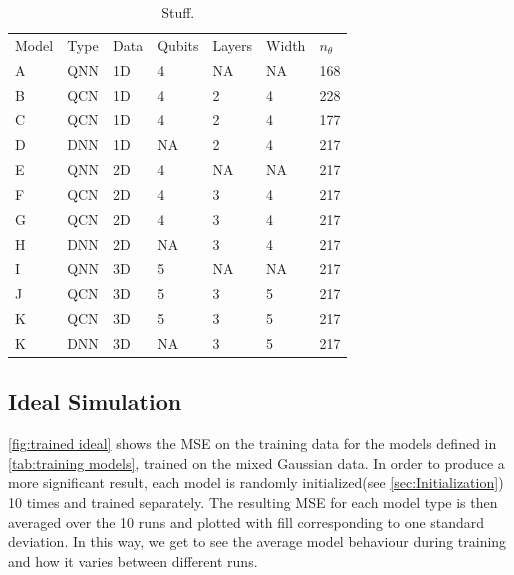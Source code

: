 \begin{table}[H]
\centering
\begin{tabular}{|l|l|l|l|l|l|l|}
\hline
Model& Type& Data& Qubits& Layers & Width &$n_{\theta}$ \\ \Xhline{3\arrayrulewidth}
A    & QNN & 1D  & 4     & NA     & NA& 168   \\ \hline
B    & QCN & 1D  & 4     & 2      & 4& 228 \\ \hline
C    & QCN & 1D  & 4     & 2      & 4& 177  \\ \hline
D    & DNN & 1D  & NA    & 2      & 4& 217  \\ \Xhline{3\arrayrulewidth}
E    & QNN & 2D  & 4     & NA     & NA& 217  \\ \hline
F    & QCN & 2D  & 4     & 3      & 4& 217  \\ \hline
G    & QCN & 2D  & 4     & 3      & 4& 217  \\ \hline
H    & DNN & 2D  & NA    & 3      & 4& 217  \\ \Xhline{3\arrayrulewidth}
I    & QNN & 3D  & 5     & NA     & NA& 217  \\ \hline
J    & QCN & 3D  & 5     & 3      & 5& 217  \\ \hline
K    & QCN & 3D  & 5     & 3      & 5& 217  \\ \hline
K    & DNN & 3D  & NA    & 3      & 5& 217  \\ \hline
\end{tabular}
\caption{Stuff.} 
\label{tab:training models}
\end{table}


\subsection{Ideal Simulation}\label{sec:Ideal Simulation}
\autoref{fig:trained ideal} shows the MSE on the training data for the models defined in \autoref{tab:training models}, trained on the mixed Gaussian data. In order to produce a more significant result, each model is randomly initialized(see \autoref{sec:Initialization}) 10 times and trained separately. The resulting MSE for each model type is then averaged over the 10 runs and plotted with fill corresponding to one standard deviation. In this way, we get to see the average model behaviour during training  and how it varies between different runs.

